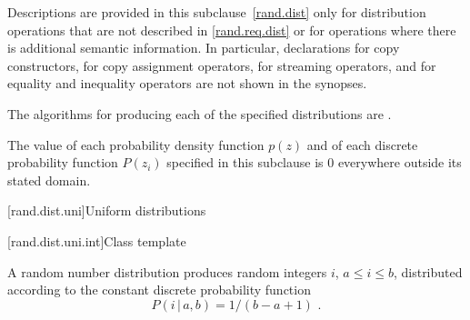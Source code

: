 \pnum
Descriptions are provided in this subclause~\ref{rand.dist}
only for distribution operations
that are not described in \ref{rand.req.dist}
or for operations where there is additional semantic information.
In particular,
declarations for copy constructors,
for copy assignment operators,
for streaming operators,
and for equality and inequality operators
are not shown in the synopses.

\pnum
The algorithms for producing each
of the specified distributions are
.

\pnum
The value of each probability density function $p(z)$
and of each discrete probability function $P(z_i)$
specified in this subclause
is $0$
everywhere outside its stated domain.


[rand.dist.uni]{Uniform distributions}%
%


[rand.dist.uni.int]{Class template }%
%

\pnum
A  random number distribution
produces random integers $i$,
$a \leq i \leq b$,
distributed according to
the constant discrete probability function%
\[  P(i\,|\,a,b) = 1 / (b - a + 1) \text{ .} \]

